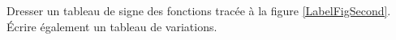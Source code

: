 
\begin{exercice}\label{exoPremiere-0060}

Dresser un tableau de signe des fonctions tracée à la figure \ref{LabelFigSecond}.
Écrire également un tableau de variations.



\newcommand{\CaptionFigSecond}{Les graphes de l'exercice \ref{exoPremiere-0060}}


\end{exercice}
